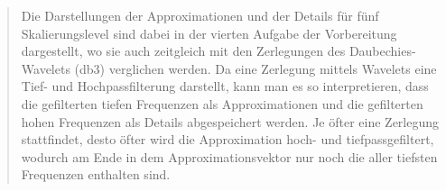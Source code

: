 \begin{quote}
        Die Darstellungen der Approximationen und der Details für fünf
        Skalierungslevel sind dabei in der vierten Aufgabe der Vorbereitung
        dargestellt, wo sie auch zeitgleich mit den Zerlegungen des
        Daubechies-Wavelets (db3) verglichen werden. Da eine Zerlegung mittels
        Wavelets eine Tief- und Hochpassfilterung darstellt, kann man es so
        interpretieren, dass die gefilterten tiefen Frequenzen als
        Approximationen und die gefilterten hohen Frequenzen als Details
        abgespeichert werden. Je öfter eine Zerlegung stattfindet, desto öfter
        wird die Approximation hoch- und tiefpassgefiltert, wodurch am Ende in
        dem Approximationsvektor nur noch die aller tiefsten Frequenzen
        enthalten sind.


        \end{quote}%
        
